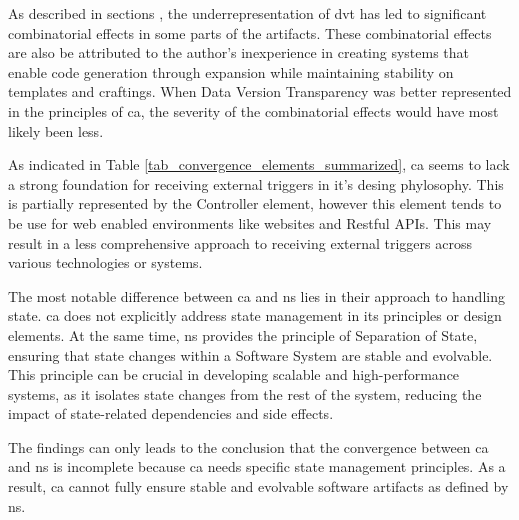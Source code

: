 As described in sections , the underrepresentation of \gls{dvt} has
led to significant combinatorial effects in some parts of the artifacts. These
combinatorial effects are also be attributed to the author's inexperience in creating
systems that enable code generation through expansion while maintaining stability on
templates and craftings. When Data Version Transparency was better represented in the
principles of \gls{ca}, the severity of the combinatorial effects would have most likely
been less.

As indicated in Table \ref{tab_convergence_elements_summarized}, \gls{ca} seems to lack a
strong foundation for receiving external triggers in it's desing phylosophy. This is
partially represented by the Controller element, however this element tends to be use for
web enabled environments like websites and Restful APIs. This may result in a less
comprehensive approach to receiving external triggers across various technologies or
systems.

The most notable difference between \gls{ca} and \gls{ns} lies in their approach to
handling state. \gls{ca} does not explicitly address state management in its principles or
design elements. At the same time, \gls{ns} provides the principle of Separation of State,
ensuring that state changes within a Software System are stable and evolvable. This
principle can be crucial in developing scalable and high-performance systems, as it
isolates state changes from the rest of the system, reducing the impact of state-related
dependencies and side effects. 

The findings can only leads to the conclusion that the convergence between \gls{ca} and
\gls{ns} is incomplete because \gls{ca} needs specific state management principles. As a
result, \gls{ca} cannot fully ensure stable and evolvable software artifacts as defined by
\gls{ns}.






